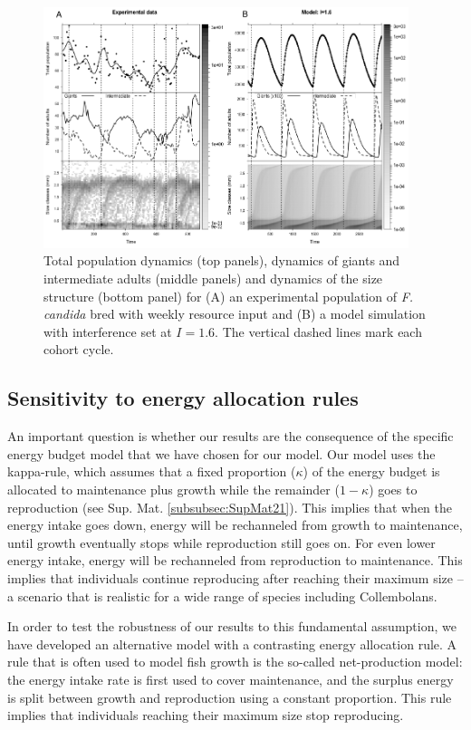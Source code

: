 \begin{figure}[!h] %
\centering
\includegraphics[width=0.95\textwidth]{4_ChapThe1/Fig/Fig6.pdf} 
\caption[Experiment -- model comparison]{Total
population dynamics (top panels), dynamics of giants and intermediate adults
(middle panels) and dynamics of the size structure (bottom panel) for (A) an
experimental population of \textit{F. candida} bred with weekly resource input
and (B) a model simulation with interference set at $I=1.6$. The vertical
dashed lines mark each cohort cycle. }
\label{Fig4-6}
\end{figure}

\subsection{Sensitivity to energy allocation rules }

An important question is whether our results are the consequence of the specific
energy budget model that we have chosen for our model. Our model uses the
kappa-rule, which assumes that a fixed proportion ($\kappa$) of the energy
budget is allocated to maintenance plus growth while the remainder ($1-\kappa$)
goes to reproduction (see Sup. Mat. \ref{subsubsec:SupMat21}). This implies
that when the energy intake goes down, energy will be rechanneled from growth to maintenance, until growth
eventually stops while reproduction still goes on. For even lower energy intake,
energy will be rechanneled from reproduction to maintenance. This implies that
individuals continue reproducing after reaching their maximum size – a scenario
that is realistic for a wide range of species including Collembolans.

In order to test the robustness of our results to this fundamental assumption,
we have developed an alternative model with a contrasting energy allocation
rule. A rule that is often used to model fish growth is the so-called
net-production model: the energy intake rate is first used to cover maintenance,
and the surplus energy is split between growth and reproduction using a constant
proportion. This rule implies that individuals reaching their maximum size stop
reproducing.

